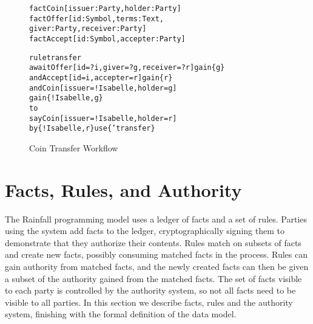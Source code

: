 
\clearpage{}

\begin{figure}
\begin{small}
\begin{alltt}
fact  Coin   [issuer: Party,  holder:   Party]
fact  Offer  [id:     Symbol, terms:    Text,
              giver:  Party,  receiver: Party]
fact  Accept [id:     Symbol, accepter: Party]

rule  transfer
await Offer  [id = ?i, giver = ?g, receiver = ?r] gain \{g\}
  and Accept [id = i,  accepter = r]              gain \{r\}
  and Coin   [issuer = !Isabelle,  holder = g]
      gain \{!Isabelle,g\}
to
  say Coin   [issuer = !Isabelle,  holder = r]
   by \{!Isabelle,r\}  use \{'transfer\}
\end{alltt}
\end{small}
\caption{Coin Transfer Workflow}
\label{f:CoinTransfer}
\end{figure}


\section{Facts, Rules, and Authority}
\label{s:FactsWeights}
The Rainfall programming model uses a ledger of facts and a set of rules. Parties using the system add facts to the ledger, cryptographically signing them to demonstrate that they authorize their contents. Rules match on subsets of facts and create new facts, possibly consuming matched facts in the process. Rules can gain authority from matched facts, and the newly created facts can then be given a subset of the authority gained from the matched facts. The set of facts visible to each party is controlled by the authority system, so not all facts need to be visible to all parties. In this section we describe facts, rules and the authority system, finishing with the formal definition of the data model.


